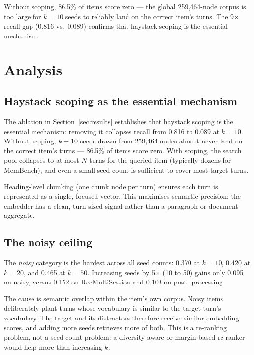 \documentclass[11pt,a4paper]{article}
\begin{document}
Without scoping, 86.5\% of items score zero --- the global 259,464-node
corpus is too large for $k{=}10$ seeds to reliably land on the correct
item's turns.
The 9$\times$ recall gap (0.816 vs.\ 0.089) confirms that haystack scoping
is the essential mechanism.

\section{Analysis}
\label{sec:analysis}

\subsection{Haystack scoping as the essential mechanism}

The ablation in Section~\ref{sec:results} establishes that haystack scoping
is the essential mechanism: removing it collapses recall from 0.816 to
0.089 at $k{=}10$.
Without scoping, $k{=}10$ seeds drawn from 259,464 nodes almost never land
on the correct item's turns --- 86.5\% of items score zero.
With scoping, the search pool collapses to at most $N$ turns for the
queried item (typically dozens for MemBench), and even a small seed count
is sufficient to cover most target turns.

Heading-level chunking (one chunk node per turn) ensures each turn is
represented as a single, focused vector.
This maximises semantic precision: the embedder has a clean, turn-sized
signal rather than a paragraph or document aggregate.

\subsection{The noisy ceiling}
\label{sec:noisy}

The \textit{noisy} category is the hardest across all seed counts:
0.370 at $k{=}10$, 0.420 at $k{=}20$, and 0.465 at $k{=}50$.
Increasing seeds by 5$\times$ (10 to 50) gains only 0.095 on noisy,
versus 0.152 on RecMultiSession and 0.103 on post\_processing.

The cause is semantic overlap within the item's own corpus.
Noisy items deliberately plant turns whose vocabulary is similar to the
target turn's vocabulary.
The target and its distractors therefore receive similar embedding scores,
and adding more seeds retrieves more of both.
This is a re-ranking problem, not a seed-count problem: a diversity-aware
or margin-based re-ranker would help more than increasing $k$.
\end{document}
